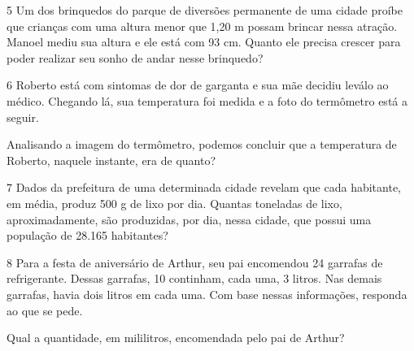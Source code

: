 {

\num{5} Um dos brinquedos do parque de diversões permanente de uma cidade
proíbe que crianças com uma altura menor que 1,20 m possam brincar nessa
atração. Manoel mediu sua altura e ele está com 93 cm. Quanto ele
precisa crescer para poder realizar seu sonho de andar nesse brinquedo?



\num{6} Roberto está com sintomas de dor de garganta e sua mãe decidiu leválo ao
médico. Chegando lá, sua temperatura foi medida e a foto do termômetro
está a seguir.


Analisando a imagem do termômetro, podemos concluir que a temperatura de
Roberto, naquele instante, era de quanto?


\num{7} Dados da prefeitura de uma determinada cidade revelam que cada
habitante, em média, produz 500 g de lixo por dia. Quantas toneladas de lixo,
aproximadamente, são produzidas, por dia, nessa cidade, que
possui uma população de 28.165 habitantes?



\num{8} Para a festa de aniversário de Arthur, seu pai encomendou 24
garrafas de refrigerante. Dessas garrafas, 10 continham, cada uma, 3
litros. Nas demais garrafas, havia dois litros em cada uma. Com base
nessas informações, responda ao que se pede.

\begin{escolha}
\item
  Qual a quantidade, em mililitros, encomendada pelo pai de Arthur?


\end{escolha}}
